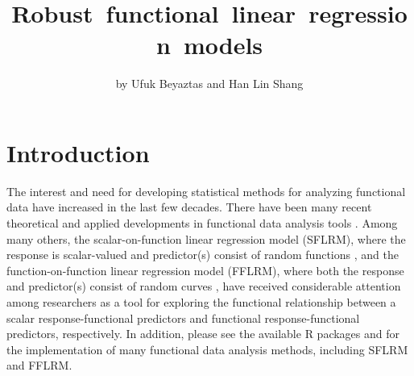 \title{\mbox{Robust functional linear regression models}}
\author{by Ufuk Beyaztas and Han Lin Shang}

\maketitle


\section*{Introduction}

The interest and need for developing statistical methods for analyzing functional data have increased in the last few decades. There have been many recent theoretical and applied developments in functional data analysis tools \citep[see][]{ramsay1991, ramsay2002, ramsay2006, ferraty2006, horvath2012, cuevas2014, Hsing, MRS15, SK16, DM16, KoRe}. Among many others, the scalar-on-function linear regression model (SFLRM), where the response is scalar-valued and predictor(s) consist of random functions \citep[see][]{cardot1991, cardot2003, james2002, ResiOgden, chen2011, jiang2011, GBC11, dou2012, TLS19, ATW20, BSchem}, and the function-on-function linear regression model (FFLRM), where both the response and predictor(s) consist of random curves \cite[see][]{yao2005, harezlak2007, senturk2008, matsui2009, ivanescu2015, SSG15, chiou2016, BeyaztasShang2020}, have received considerable attention among researchers as a tool for exploring the functional relationship between a scalar response-functional predictors and functional response-functional predictors, respectively. In addition, please see the available \textsf{R} packages  \citep{RGH22} and  \citep{GSH22} for the implementation of many functional data analysis methods, including SFLRM and FFLRM.

